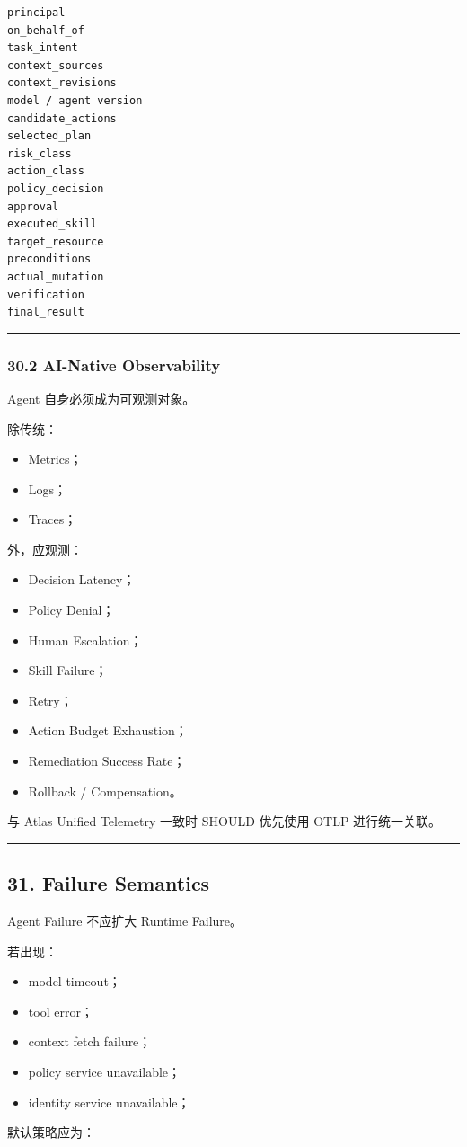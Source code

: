 \documentclass[11pt,a4paper]{article}
\begin{document}
\begin{lstlisting}[language=text]
principal
on_behalf_of
task_intent
context_sources
context_revisions
model / agent version
candidate_actions
selected_plan
risk_class
action_class
policy_decision
approval
executed_skill
target_resource
preconditions
actual_mutation
verification
final_result
\end{lstlisting}
\vspace{0.5em}\hrule\vspace{0.5em}
\subsubsection{30.2 AI-Native Observability}
Agent 自身必须成为可观测对象。

除传统：

\begin{itemize}
  \item Metrics；
  \item Logs；
  \item Traces；
\end{itemize}
外，应观测：

\begin{itemize}
  \item Decision Latency；
  \item Policy Denial；
  \item Human Escalation；
  \item Skill Failure；
  \item Retry；
  \item Action Budget Exhaustion；
  \item Remediation Success Rate；
  \item Rollback / Compensation。
\end{itemize}
与 Atlas Unified Telemetry 一致时 SHOULD 优先使用 OTLP 进行统一关联。

\vspace{0.5em}\hrule\vspace{0.5em}
\subsection{31. Failure Semantics}
Agent Failure 不应扩大 Runtime Failure。

若出现：

\begin{itemize}
  \item model timeout；
  \item tool error；
  \item context fetch failure；
  \item policy service unavailable；
  \item identity service unavailable；
\end{itemize}
默认策略应为：
\end{document}
